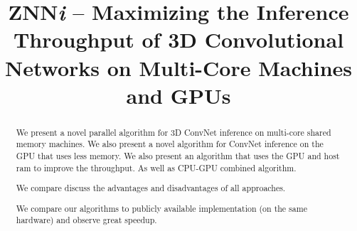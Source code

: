\documentclass[conference]{IEEEtran}
\begin{document}

\title{ZNN\emph{i} -- Maximizing the Inference Throughput of 3D
  Convolutional Networks on Multi-Core Machines and GPUs}

\author{
  \and {}
  }


\maketitle



\begin{abstract}

We present a novel parallel algorithm for 3D ConvNet inference on
multi-core shared memory machines.  We also present a novel algorithm
for ConvNet inference on the GPU that uses less memory.  We also
present an algorithm that uses the GPU and host ram to improve the
throughput.  As well as CPU-GPU combined algorithm.

We compare discuss the advantages and disadvantages of all approaches.

We compare our algorithms to publicly available implementation (on the
same hardware) and observe great speedup.

\end{abstract}
\end{document}
